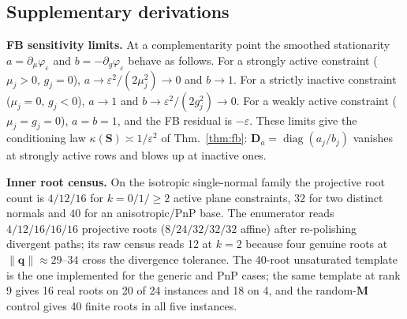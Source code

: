 \subsection{Supplementary derivations}\label{app:deriv}
\textbf{FB sensitivity limits.} At a complementarity point the smoothed stationarity $a=\partial_\mu\varphi_\varepsilon$ and $b=-\partial_g\varphi_\varepsilon$ behave as follows. For a strongly active constraint ($\mu_j>0$, $g_j=0$), $a\to\varepsilon^2/(2\mu_j^2)\to0$ and $b\to1$. For a strictly inactive constraint ($\mu_j=0$, $g_j<0$), $a\to1$ and $b\to\varepsilon^2/(2g_j^2)\to0$. For a weakly active constraint ($\mu_j=g_j=0$), $a=b=1$, and the FB residual is $-\varepsilon$. These limits give the conditioning law $\kappa(\mathbf S)\asymp1/\varepsilon^2$ of Thm.~\ref{thm:fb}: $\mathbf D_a=\operatorname{diag}(a_j/b_j)$ vanishes at strongly active rows and blows up at inactive ones.

\textbf{Inner root census.} On the isotropic single-normal family the projective root count is $4/12/16$ for $k=0/1/\ge2$ active plane constraints, $32$ for two distinct normals and $40$ for an anisotropic/PnP base. The enumerator reads $4/12/16/16/16$ projective roots ($8/24/32/32/32$ affine) after re-polishing divergent paths; its raw census reads 12 at $k=2$ because four genuine roots at $\|\mathbf q\|\approx29$--$34$ cross the divergence tolerance. The 40-root unsaturated template is the one implemented for the generic and PnP cases; the same template at rank 9 gives 16 real roots on 20 of 24 instances and 18 on 4, and the random-$\mathbf M$ control gives 40 finite roots in all five instances.
